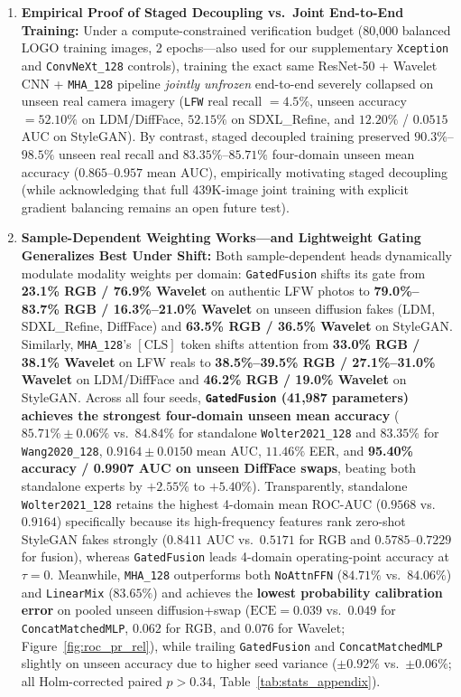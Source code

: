 \documentclass[fleqn,10pt]{wlscirep}
\begin{document}
\begin{enumerate}
    \item \textbf{Empirical Proof of Staged Decoupling vs.\ Joint End-to-End Training:} Under a compute-constrained verification budget (80,000 balanced LOGO training images, 2 epochs---also used for our supplementary \texttt{Xception} and \texttt{ConvNeXt\_128} controls), training the exact same ResNet-50 + Wavelet CNN + \texttt{MHA\_128} pipeline \emph{jointly unfrozen} end-to-end severely collapsed on unseen real camera imagery (\texttt{LFW} real recall $=4.5\%$, unseen accuracy $=52.10\%$ on LDM/DiffFace, $52.15\%$ on SDXL\_Refine, and $12.20\%$ / $0.0515$ AUC on StyleGAN). By contrast, staged decoupled training preserved $90.3\%$--$98.5\%$ unseen real recall and $83.35\%$--$85.71\%$ four-domain unseen mean accuracy ($0.865$--$0.957$ mean AUC), empirically motivating staged decoupling (while acknowledging that full 439K-image joint training with explicit gradient balancing remains an open future test).
    \item \textbf{Sample-Dependent Weighting Works---and Lightweight Gating Generalizes Best Under Shift:} Both sample-dependent heads dynamically modulate modality weights per domain: \texttt{GatedFusion} shifts its gate from \textbf{23.1\% RGB / 76.9\% Wavelet} on authentic LFW photos to \textbf{79.0\%--83.7\% RGB / 16.3\%--21.0\% Wavelet} on unseen diffusion fakes (LDM, SDXL\_Refine, DiffFace) and \textbf{63.5\% RGB / 36.5\% Wavelet} on StyleGAN. Similarly, \texttt{MHA\_128}'s $[\text{CLS}]$ token shifts attention from \textbf{33.0\% RGB / 38.1\% Wavelet} on LFW reals to \textbf{38.5\%--39.5\% RGB / 27.1\%--31.0\% Wavelet} on LDM/DiffFace and \textbf{46.2\% RGB / 19.0\% Wavelet} on StyleGAN. Across all four seeds, \textbf{\texttt{GatedFusion} (41,987 parameters) achieves the strongest four-domain unseen mean accuracy} ($85.71\% \pm 0.06\%$ vs.\ $84.84\%$ for standalone \texttt{Wolter2021\_128} and $83.35\%$ for \texttt{Wang2020\_128}, $0.9164 \pm 0.0150$ mean AUC, $11.46\%$ EER, and \textbf{95.40\% accuracy / 0.9907 AUC on unseen DiffFace swaps}, beating both standalone experts by $+2.55\%$ to $+5.40\%$). Transparently, standalone \texttt{Wolter2021\_128} retains the highest 4-domain mean ROC-AUC ($0.9568$ vs.\ $0.9164$) specifically because its high-frequency features rank zero-shot StyleGAN fakes strongly ($0.8411$ AUC vs.\ $0.5171$ for RGB and $0.5785$--$0.7229$ for fusion), whereas \texttt{GatedFusion} leads 4-domain operating-point accuracy at $\tau=0$. Meanwhile, \texttt{MHA\_128} outperforms both \texttt{NoAttnFFN} ($84.71\%$ vs.\ $84.06\%$) and \texttt{LinearMix} ($83.65\%$) and achieves the \textbf{lowest probability calibration error} on pooled unseen diffusion+swap ($\text{ECE}=0.039$ vs.\ $0.049$ for \texttt{ConcatMatchedMLP}, $0.062$ for RGB, and $0.076$ for Wavelet; Figure~\ref{fig:roc_pr_rel}), while trailing \texttt{GatedFusion} and \texttt{ConcatMatchedMLP} slightly on unseen accuracy due to higher seed variance ($\pm 0.92\%$ vs.\ $\pm 0.06\%$; all Holm-corrected paired $p>0.34$, Table~\ref{tab:stats_appendix}).

\end{enumerate}
\end{document}
